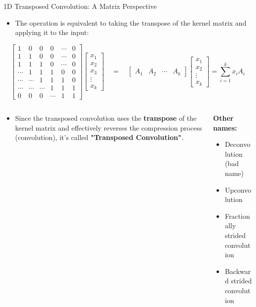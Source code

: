 \documentclass[serif, aspectratio=169]{beamer}
\begin{document}
\begin{frame}{1D Transposed Convolution: A Matrix Perspective}
\small
\begin{itemize}
    \item The operation is equivalent to taking the transpose of the kernel matrix and applying it to the input:
\end{itemize}

\[
\begin{bmatrix}
    1 & 0 & 0 & 0 & \cdots & 0 \\
    1 & 1 & 0 & 0 & \cdots & 0 \\
    1 & 1 & 1 & 0 & \cdots & 0 \\
    \cdots & 1 & 1 & 1 & 0 & 0 \\
    \cdots & \cdots & 1 & 1 & 1 & 0 \\
    \cdots & \cdots & \cdots & 1 & 1 & 1 \\
    0 & 0 & 0 & \cdots & 1 & 1
\end{bmatrix}
\begin{bmatrix}
    x_1 \\ x_2 \\ x_3 \\ \vdots \\ x_k
\end{bmatrix}
\quad = \quad
\begin{bmatrix}
    A_1 & A_2 & \cdots & A_k
\end{bmatrix}
\begin{bmatrix}
    x_1 \\ x_2 \\ \vdots \\ x_k
\end{bmatrix}
= \sum_{i=1}^k x_i A_i
\]


\begin{columns}[T]
    \begin{column}{0.75\textwidth}
      \vspace{0.3cm}
        \begin{itemize}
            \item Since the transposed convolution uses the \textbf{transpose} of the kernel matrix and effectively reverses the compression process (convolution), it’s called \textbf{"Transposed Convolution"}.
        \end{itemize}
    \end{column}

  \begin{column}{0.34\textwidth}
    \scriptsize
    \textbf{Other names:}
    \vspace{-0.2cm}
    \begin{itemize}
        \setlength{\itemsep}{0pt} %
        \setlength{\parskip}{0pt} %
        \item Deconvolution (bad name)
        \item Upconvolution
        \item Fractionally strided convolution
        \item Backward strided convolution
    \end{itemize}
\end{column}


\end{columns}
\end{frame}
\end{document}
